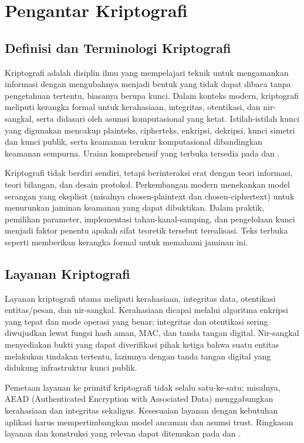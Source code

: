 \documentclass[../main.tex]{subfiles}
\begin{document}
\chapter{Pengantar Kriptografi}

\section{Definisi dan Terminologi Kriptografi}
Kriptografi adalah disiplin ilmu yang mempelajari teknik untuk mengamankan informasi dengan mengubahnya menjadi bentuk yang tidak dapat dibaca tanpa pengetahuan tertentu, biasanya berupa kunci. Dalam konteks modern, kriptografi meliputi kerangka formal untuk kerahasiaan, integritas, otentikasi, dan nir-sangkal, serta didasari oleh asumsi komputasional yang ketat. Istilah-istilah kunci yang digunakan mencakup plainteks, cipherteks, enkripsi, dekripsi, kunci simetri dan kunci publik, serta keamanan terukur komputasional dibandingkan keamanan sempurna. Uraian komprehensif yang terbuka tersedia pada \textcite{menezes1996handbook} dan \textcite{bonehshoup2020}.

Kriptografi tidak berdiri sendiri, tetapi berinteraksi erat dengan teori informasi, teori bilangan, dan desain protokol. Perkembangan modern menekankan model serangan yang eksplisit (misalnya chosen-plaintext dan chosen-ciphertext) untuk menurunkan jaminan keamanan yang dapat dibuktikan. Dalam praktik, pemilihan parameter, implementasi tahan-kanal-samping, dan pengelolaan kunci menjadi faktor penentu apakah sifat teoretik tersebut terealisasi. Teks terbuka seperti \textcite{bonehshoup2020} memberikan kerangka formal untuk memahami jaminan ini.

\section{Layanan Kriptografi}
Layanan kriptografi utama meliputi kerahasiaan, integritas data, otentikasi entitas/pesan, dan nir-sangkal. Kerahasiaan dicapai melalui algoritma enkripsi yang tepat dan mode operasi yang benar; integritas dan otentikasi sering diwujudkan lewat fungsi hash aman, MAC, dan tanda tangan digital. Nir-sangkal menyediakan bukti yang dapat diverifikasi pihak ketiga bahwa suatu entitas melakukan tindakan tertentu, lazimnya dengan tanda tangan digital yang didukung infrastruktur kunci publik.

Pemetaan layanan ke primitif kriptografi tidak selalu satu-ke-satu; misalnya, AEAD (Authenticated Encryption with Associated Data) menggabungkan kerahasiaan dan integritas sekaligus. Kesesuaian layanan dengan kebutuhan aplikasi harus mempertimbangkan model ancaman dan asumsi trust. Ringkasan layanan dan konstruksi yang relevan dapat ditemukan pada \textcite{rfc5116} dan \textcite{nist80038d}.
\end{document}

